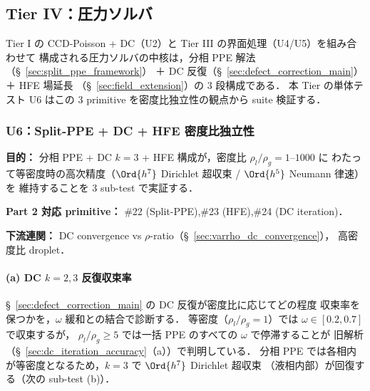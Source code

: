 %
\subsection{Tier IV：圧力ソルバ}
\label{sec:verify_solver}

Tier I の CCD-Poisson + DC（U2）と Tier III の界面処理（U4/U5）を組み合わせて
構成される圧力ソルバの中核は，分相 PPE 解法（§~\ref{sec:split_ppe_framework}）
＋ DC 反復（§~\ref{sec:defect_correction_main}）＋ HFE 場延長
（§~\ref{sec:field_extension}）の 3 段構成である．
本 Tier の単体テスト U6 はこの 3 primitive を密度比独立性の観点から
suite 検証する．

\subsubsection{U6：Split-PPE + DC + HFE 密度比独立性}
\label{sec:U6_split_ppe_dc_hfe}

\noindent\textbf{目的：}
分相 PPE + DC $k = 3$ + HFE 構成が，密度比 $\rho_l/\rho_g = 1$--$1000$ に
わたって等密度時の高次精度（$\Ord{h^7}$ Dirichlet 超収束 / $\Ord{h^5}$ Neumann 律速）を
維持することを 3 sub-test で実証する．

\noindent\textbf{Part 2 対応 primitive：}
\#22 (Split-PPE),\#23 (HFE),\#24 (DC iteration)．

\noindent\textbf{下流連関：}
DC convergence vs $\rho$-ratio（§~\ref{sec:varrho_dc_convergence}），
高密度比 droplet．

\paragraph{(a) DC $k = 2, 3$ 反復収束率}
\label{sec:U6_dc_iteration_rate}

§~\ref{sec:defect_correction_main} の DC 反復が密度比に応じてどの程度
収束率を保つかを，$\omega$ 緩和との結合で診断する．
等密度（$\rho_l/\rho_g = 1$）では $\omega \in [0.2, 0.7]$ で収束するが，
$\rho_l/\rho_g \geq 5$ では一括 PPE のすべての $\omega$ で停滞することが
旧解析（§~\ref{sec:dc_iteration_accuracy}（a））で判明している．
分相 PPE では各相内が等密度となるため，$k = 3$ で $\Ord{h^7}$ Dirichlet 超収束
（液相内部）が回復する（次の sub-test (b)）．

